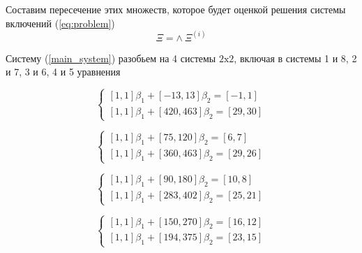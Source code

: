 \documentclass[12pt,a4paper]{article}
\begin{document}
        Составим пересечение этих множеств, которое будет оценкой решения системы включений (\ref{eq:problem})
        $$
            \Xi = \wedge \: \Xi^{(i)}
        $$
        
        Систему (\ref{main_system}) разобьем на 4 системы $2\text{x}2$, включая в системы 1 и 8, 2 и 7, 3 и 6, 4 и 5 уравнения
        
        \begin{equation}
             \begin{cases}
               [1, 1]\beta_{1} + [-13, 13]\beta_{2} = [-1, 1]\\
               [1, 1]\beta_{1} + [420, 463]\beta_{2} = [29, 30]
             \end{cases}
        \end{equation}
        
        \begin{equation}
             \begin{cases}
               [1, 1]\beta_{1} + [75, 120]\beta_{2} = [6, 7]\\
               [1, 1]\beta_{1} + [360, 463]\beta_{2} = [29, 26]
             \end{cases}
        \end{equation}
        
        \begin{equation}
             \begin{cases}
               [1, 1]\beta_{1} + [90, 180]\beta_{2} = [10, 8]\\
               [1, 1]\beta_{1} + [283, 402]\beta_{2} = [25, 21]
             \end{cases}
        \end{equation}
        
        \begin{equation}
             \begin{cases}
               [1, 1]\beta_{1} + [150, 270]\beta_{2} = [16, 12]\\
               [1, 1]\beta_{1} + [194, 375]\beta_{2} = [23, 15]
             \end{cases}
        \end{equation}
        
\end{document}
